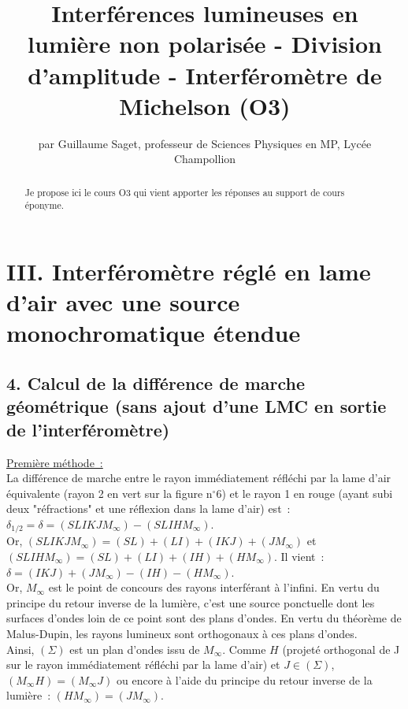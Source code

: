 \documentclass{article}
\title{\huge{\textbf{Interférences lumineuses en lumière non polarisée - Division d'amplitude - Interféromètre de Michelson (O3)}}}
\author{par Guillaume Saget, professeur de Sciences Physiques en MP, Lycée Champollion}
\date{}
\begin{document}
\maketitle


\begin{abstract}
Je propose ici le cours O3 qui vient apporter les réponses au
support de cours éponyme.
\end{abstract}


\section*{III. Interféromètre réglé en lame d'air avec une source monochromatique étendue}
\subsection*{4.  Calcul de la différence de marche géométrique (sans ajout d'une LMC en sortie de l'interféromètre)}
\underline{Première méthode :}\\
La différence de marche entre le rayon immédiatement réfléchi par la
lame d'air équivalente (rayon 2 en vert sur la figure n$^{\circ}$6)
et le rayon 1 en rouge (ayant subi deux "réfractions" et une
réflexion dans la lame d'air) est : \\
$\delta_{\mathrm{1/2}} = \delta = \left(SLIKJM_{\mathrm{\infty}}\right)-\left(SLIHM_{\mathrm{\infty}}\right)$. \\
Or, $\left(SLIKJM_{\mathrm{\infty}}\right) = (SL)+(LI)+(IKJ)+\left(JM_{\mathrm{\infty}}\right)$ et
$\left(SLIHM_{\mathrm{\infty}}\right) = (SL)+(LI)+(IH)+\left(HM_{\mathrm{\infty}}\right)$. Il vient :
$\delta = (IKJ)+\left(JM_{\mathrm{\infty}}\right) - (IH)-\left(HM_{\mathrm{\infty}}\right)$. \\
Or, $M_{\mathrm{\infty}}$ est le point de concours des rayons interférant à
l'infini. En vertu du principe du retour inverse de la lumière,
c'est une source ponctuelle dont les surfaces d'ondes loin de ce
point sont des plans d'ondes. En vertu du théorème de Malus-Dupin,
les rayons lumineux sont orthogonaux à ces plans d'ondes. \\
Ainsi, $\left(\Sigma\right)$ est un plan d'ondes issu de $M_{\mathrm{\infty}}$. Comme
$H$ (projeté orthogonal de J sur le rayon immédiatement réfléchi par
la lame d'air) et $J \in \left(\Sigma\right)$, $\left(M_{\mathrm{\infty}}H\right) = \left(M_{\mathrm{\infty}}J\right)$
ou encore à l'aide du principe du retour inverse de la lumière : $\left(HM_{\mathrm{\infty}}\right) = \left(JM_{\mathrm{\infty}}\right)$. \\
\end{document}
